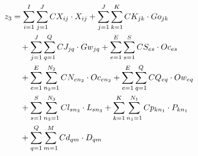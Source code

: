 \documentclass[conference]{IEEEtran}
\begin{document}
\begin{align}
  z_3 &= \sum_{i=1}^I\sum_{j=1}^J CX_{ij} \cdot X_{ij} 
      + \sum_{j=1}^J\sum_{k=1}^K CK_{jk} \cdot Go_{jk} \notag \\
      &\quad + \sum_{j=1}^J\sum_{q=1}^Q CJ_{jq} \cdot Gw_{jq}
      + \sum_{e=1}^E\sum_{s=1}^S CS_{es} \cdot Oc_{es} \notag \\
      &\quad + \sum_{e=1}^E\sum_{n_2=1}^{N_2} CN_{en_2} \cdot Oc_{en_2}
      + \sum_{e=1}^E\sum_{q=1}^Q CQ_{eq} \cdot Ow_{eq} \notag \\
      &\quad + \sum_{s=1}^S\sum_{n_3=1}^{N_3} Cl_{sn_3} \cdot L_{sn_3}
      + \sum_{k=1}^K\sum_{n_1=1}^{N_1} Cp_{kn_1} \cdot P_{kn_1} \notag \\
      &\quad + \sum_{q=1}^Q\sum_{m=1}^M Cd_{qm} \cdot D_{qm}
      \label{eq:custo3}
\end{align}
\end{document}
